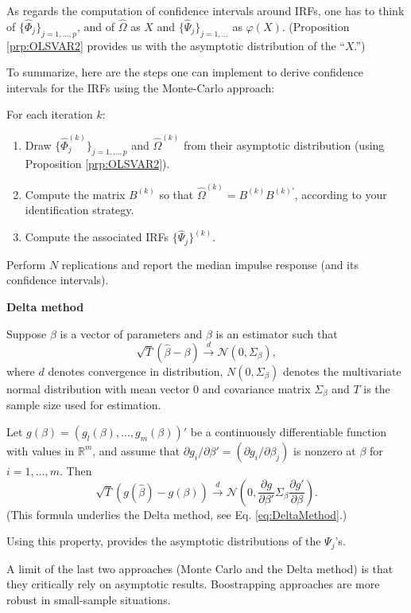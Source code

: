 \documentclass[
  12pt,
]{book}
\providecommand{\tightlist}{%
  \setlength{\itemsep}{0pt}\setlength{\parskip}{0pt}}
\theoremstyle{definition}
\theoremstyle{definition}
\theoremstyle{definition}
\theoremstyle{definition}
\theoremstyle{remark}
\begin{document}
As regards the computation of confidence intervals around IRFs, one has to think of \(\{\widehat{\Phi}_j\}_{j=1,...,p}\), and of \(\widehat{\Omega}\) as \(X\) and \(\{\widehat{\Psi}_j\}_{j=1,...}\) as \(\varphi(X)\). (Proposition \ref{prp:OLSVAR2} provides us with the asymptotic distribution of the ``\(X\).'')

To summarize, here are the steps one can implement to derive confidence intervals for the IRFs using the Monte-Carlo approach:

For each iteration \(k\):

\begin{enumerate}
\def\labelenumi{\arabic{enumi}.}
\tightlist
\item
  Draw \(\{\widehat{\Phi}_j^{(k)}\}_{j=1,...,p}\) and \(\widehat{\Omega}^{(k)}\) from their asymptotic distribution (using Proposition \ref{prp:OLSVAR2}).
\item
  Compute the matrix \(B^{(k)}\) so that \(\widehat{\Omega}^{(k)}=B^{(k)}B^{(k)'}\), according to your identification strategy.
\item
  Compute the associated IRFs \(\{\widehat{\Psi}_j\}^{(k)}\).
\end{enumerate}

Perform \(N\) replications and report the median impulse response (and its confidence intervals).

\textbf{Delta method}

Suppose \(\beta\) is a vector of parameters and \(\beta\) is an estimator such that
\[
\sqrt{T}(\hat\beta-\beta)\overset{d}{\rightarrow}\mathcal{N}(0,\Sigma_\beta),
\]
where \(d\) denotes convergence in distribution, \(N(0,\Sigma_\beta)\) denotes the multivariate normal distribution with mean vector 0 and covariance matrix \(\Sigma_\beta\) and \(T\) is the sample size used for estimation.

Let \(g(\beta) = (g_l(\beta),..., g_m(\beta))'\) be a continuously differentiable function with values in \(\mathbb{R}^m\), and assume that \(\partial g_i/\partial \beta' = (\partial g_i/\partial \beta_j)\) is nonzero at \(\beta\) for \(i = 1,\dots, m\). Then
\[
\sqrt{T}(g(\hat\beta)-g(\beta))\overset{d}{\rightarrow}\mathcal{N}\left(0,\frac{\partial g}{\partial \beta'}\Sigma_\beta\frac{\partial g'}{\partial \beta}\right).
\]
(This formula underlies the Delta method, see Eq. \eqref{eq:DeltaMethod}.)

Using this property, \citet{Lutkepohl_1990} provides the asymptotic distributions of the \(\Psi_j\)'s.

A limit of the last two approaches (Monte Carlo and the Delta method) is that they critically rely on asymptotic results. Boostrapping approaches are more robust in small-sample situations.
\end{document}
